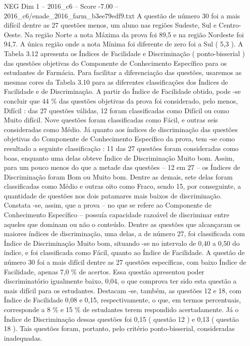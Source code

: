 \begin{textsample}{NEG Dim 1 – 2016\_c6 – Score -7.00 – 2016\_c6/enade\_2016\_farm\_b3ee79edf9.txt}
A questão de número 30 foi a mais difícil dentre as 27 questões menos, um aluno nas regiões Sudeste, Sul e Centro-Oeste.
Na região Norte a nota Máxima da prova foi 89,5 e na região Nordeste foi 94,7.
A única região onde a nota Mínima foi diferente de zero foi a Sul ( 5,3 ).
A Tabela 3.12 apresenta os Índices de Facilidade e Discriminação ( ponto-bisserial ) das questões objetivas do Componente de Conhecimento Específico para os estudantes de Farmácia.
Para facilitar a diferenciação das questões, usaremos as mesmas cores da Tabela 3.10 para as diferentes classificações dos Índices de Facilidade e de Discriminação.
A partir do Índice de Facilidade obtido, pode -se concluir que 44 \% das questões objetivas da prova foi considerado, pelo menos, Difícil : das 27 questões válidas, 12 foram classificadas como Difícil ou como Muito difícil.
Nove questões foram classificadas como Fácil, e outras seis consideradas como Médio.
Já quanto aos índices de discriminação das questões objetivas do Componente de Conhecimento Específico da prova, tem -se como resultado a seguinte classificação : 11 das 27 questões foram consideradas como boas, enquanto uma delas obteve Índice de Discriminação Muito bom.
Assim, para um pouco menos do que a metade das questões – 12 em 27 – os Índices de Discriminação foram Bom ou Muito bom.
Dentre as demais, sete delas foram classificadas como Médio e outras oito como Fraco, sendo 15, por conseguinte, a quantidade de questões nos dois patamares mais baixos de discriminação.
Constata -se, assim, que a prova – no que se refere ao Componente de Conhecimento Específico – possuía capacidade razoável de discriminar entre aqueles que dominam ou não o conteúdo.
Dentre as questões que alcançaram os maiores índices de discriminação, uma delas, a de número 27, foi classificada com Índice de Discriminação Muito bom, situando -se no intervalo de 0,40 a 0,50 do índice, e foi classificada como Fácil, quanto ao Índice de Facilidade.
A questão de número 30 foi a mais difícil dentre as 27 questões específicas, com baixo Índice de Facilidade, apenas 7,0 \% de acertos.
Essa questão apresentou poder discriminatório igualmente baixo, 0,04, o que comprova ter sido esta questão a mais difícil para os estudantes.
Destacam -se, também, as questões 12 e 18, com Índice de Facilidade 0,08 e 0,15, respectivamente, o que, em termos percentuais, corresponde a 8 \% e 15 \% de estudantes terem respondido acertadamente.
Já o Índice de Discriminação dessas questões foi 0,15 ( questão 12 ) e 0,13 ( questão 18 ).
Tais questões foram, portanto, pelo critério ponto-bisserial, consideradas inadequadas.

\end{textsample}
